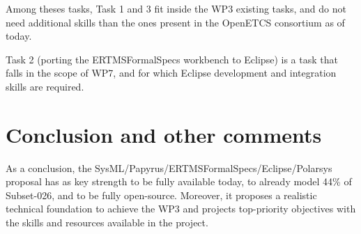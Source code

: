 Among theses tasks, Task 1 and 3 fit inside the WP3 existing tasks, and do not need additional skills than the ones present in the OpenETCS consortium as of today.

Task 2 (porting the ERTMSFormalSpecs workbench to Eclipse) is a task that falls in the scope of WP7, and for which Eclipse development and integration skills are required.

\section{Conclusion and other comments}

As a conclusion, the SysML/Papyrus/ERTMSFormalSpecs/Eclipse/Polarsys proposal has as key strength to be fully available today, to already model 44\% of Subset-026, and to be fully open-source. Moreover, it proposes a realistic technical foundation to achieve the WP3 and projects top-priority objectives with the skills and resources available in the project.
